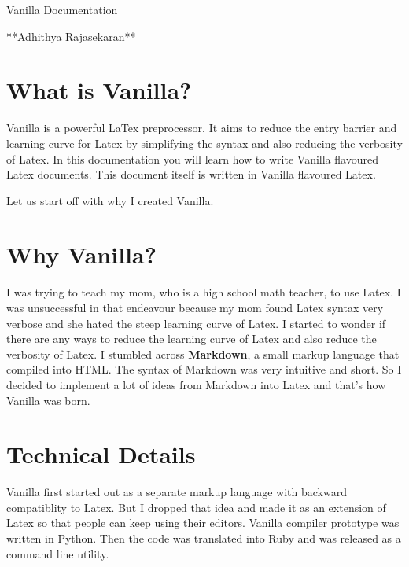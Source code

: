 \documentclass{article}
\begin{document}
\begin{center}

\huge{Vanilla Documentation}\vspace{5pt}

\large{**Adhithya Rajasekaran**}

\end{center}

\vspace{30pt}

\section*{What is Vanilla?}

Vanilla is a powerful LaTex preprocessor. It aims to reduce the entry barrier and learning curve for Latex by simplifying the syntax and also reducing the verbosity of Latex. In this documentation you will learn how to write Vanilla flavoured Latex documents. This document itself is written in Vanilla flavoured Latex. \vspace{5pt}

Let us start off with why I created Vanilla. \vspace{5pt}

\section*{Why Vanilla?}

I was trying to teach my mom, who is a high school math teacher, to use Latex. I was unsuccessful in that endeavour because my mom found Latex syntax very verbose and she hated the steep learning curve of Latex. I started to wonder if there are any ways to reduce the learning curve of Latex and also reduce the verbosity of Latex. I stumbled across \textbf{Markdown}, a small markup language that compiled into HTML. The syntax of Markdown was very intuitive and short. So I decided to implement a lot of ideas from Markdown into Latex and that's how Vanilla was born. 

\section*{Technical Details}

Vanilla first started out as a separate markup language with backward compatiblity to Latex. But I dropped that idea and made it as an extension of Latex so that people can keep using their editors. Vanilla compiler prototype was written in Python. Then the code was translated into Ruby and was released as a command line utility.
\end{document}
